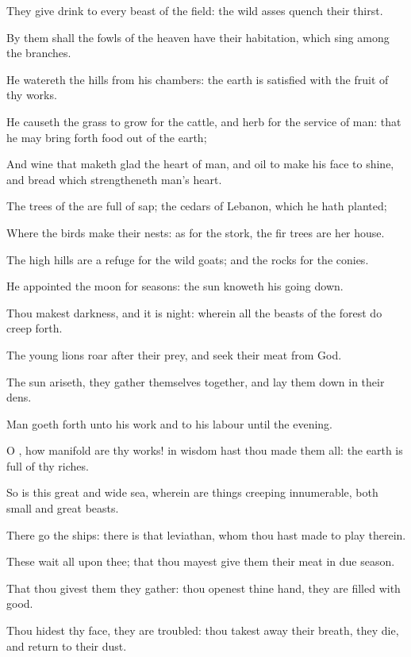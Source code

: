 \verse They give drink to every beast of the field: the wild asses quench their thirst.

\verse By them shall the fowls of the heaven have their habitation, which sing among the branches.

\verse He watereth the hills from his chambers: the earth is satisfied with the fruit of thy works.

\verse He causeth the grass to grow for the cattle, and herb for the service of man: that he may bring forth food out of the earth;

\verse And wine that maketh glad the heart of man, and oil to make his face to shine, and bread which strengtheneth man's heart.

\verse The trees of the \LORD are full of sap; the cedars of Lebanon, which he hath planted;

\verse Where the birds make their nests: as for the stork, the fir trees are her house.

\verse The high hills are a refuge for the wild goats; and the rocks for the conies.

\verse He appointed the moon for seasons: the sun knoweth his going down.

\verse Thou makest darkness, and it is night: wherein all the beasts of the forest do creep forth.

\verse The young lions roar after their prey, and seek their meat from God.

\verse The sun ariseth, they gather themselves together, and lay them down in their dens.

\verse Man goeth forth unto his work and to his labour until the evening.

\verse O \LORD, how manifold are thy works! in wisdom hast thou made them all: the earth is full of thy riches.

\verse So is this great and wide sea, wherein are things creeping innumerable, both small and great beasts.

\verse There go the ships: there is that leviathan, whom thou hast made to play therein.

\verse These wait all upon thee; that thou mayest give them their meat in due season.

\verse That thou givest them they gather: thou openest thine hand, they are filled with good.

\verse Thou hidest thy face, they are troubled: thou takest away their breath, they die, and return to their dust.

